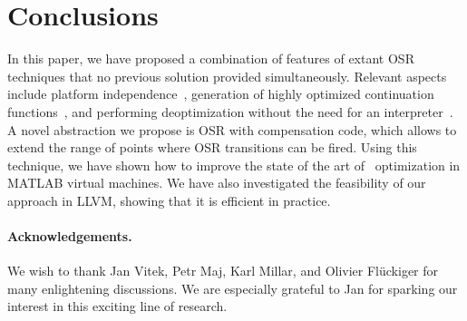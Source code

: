 
\section{Conclusions}
\label{se:conclusions}

In this paper, we have proposed a combination of features of extant OSR techniques that no previous solution provided simultaneously. Relevant aspects include platform independence~\cite{lameed2013modular}, generation of highly optimized continuation functions~\cite{fink2003design}, and performing deoptimization without the need for an interpreter~\cite{bebenita2010spur}. A novel abstraction we propose is OSR with compensation code, which allows to extend the range of points where OSR transitions can be fired. Using this technique, we have shown how to improve the state of the art of \feval\ optimization in MATLAB virtual machines. We have also investigated the feasibility of our approach in LLVM, showing that it is efficient in practice.

\ifx\noauthorea\undefined
\paragraph{Acknowledgements.}

We wish to thank Jan Vitek, Petr Maj, Karl Millar, and Olivier Fl{\"u}ckiger for many enlightening discussions. We are especially grateful to Jan for sparking our interest in this exciting line of research. %
\fi
